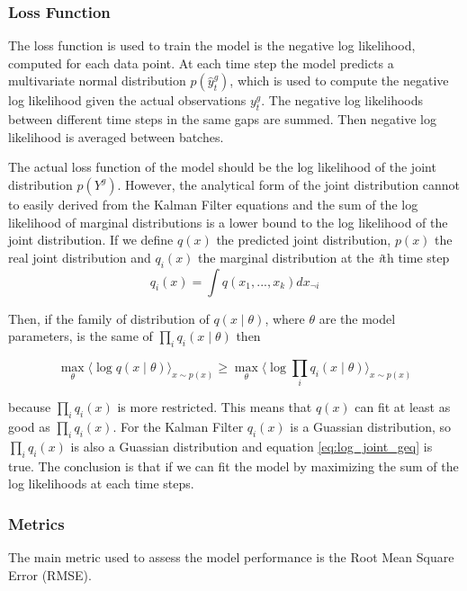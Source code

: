 \documentclass{article}
\newcommand{\E}[1]{\langle #1 \rangle} %
\begin{document}
\subsubsection{Loss Function}

The loss function is used to train the model is the negative log likelihood, computed for each data point. At each time step the model predicts a multivariate normal distribution $p(\hat{y}^g_t)$, which is used to compute the negative log likelihood given the actual observations $y_t^g$. The negative log likelihoods between different time steps in the same gaps are summed. Then negative log likelihood is averaged between batches.

The actual loss function of the model should be the log likelihood of the joint distribution $p(Y^g)$. However, the analytical form of the joint distribution cannot to easily derived from the Kalman Filter equations and the sum of the log likelihood of marginal distributions is a lower bound to the log likelihood of the joint distribution. If we define $q(x)$ the predicted joint distribution, $p(x)$ the real joint distribution and $q_i(x)$ the marginal distribution at the \textit{i}th time step
\begin{equation}
    q_i(x) = \int q(x_1, ..., x_k)dx_{\neg i}
\end{equation}

Then, if the family of distribution of $q(x \mid \theta)$, where $\theta$ are the model parameters, is the same of $\prod_i q_i(x \mid \theta)$ then

\begin{equation}\label{eq:log_joint_geq}
    \max_\theta \E{\log q(x\mid \theta)}_{x \sim p(x)} \geq \max_\theta \E{\log \prod_i q_i(x\mid \theta)}_{x \sim p(x)}
\end{equation}

because $\prod_i q_i(x)$ is more restricted. This means that $q(x)$ can fit at least as good as $\prod_i q_i(x)$.
For the Kalman Filter $q_i(x)$ is a Guassian distribution, so $\prod_i q_i(x)$ is also a Guassian distribution and equation \ref{eq:log_joint_geq} is true. The conclusion is that if we can fit the model by maximizing the sum of the log likelihoods at each time steps.

\subsubsection{Metrics}

The main metric used to assess the model performance is the Root Mean Square Error (RMSE). 
\end{document}
